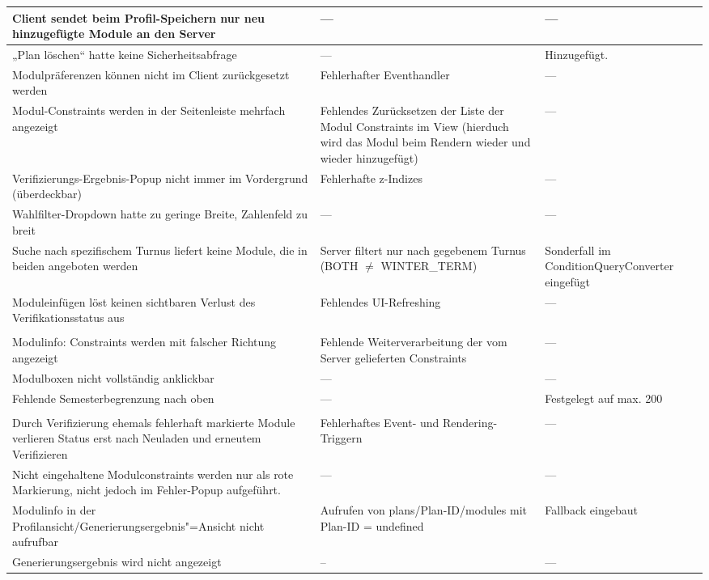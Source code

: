\begin{longtable}{| >{\hspace{0pt}} p{} | >{\hspace{0pt}} p{} | >{\hspace{0pt}} p{} | }
	\hline
	Client sendet beim Profil-Speichern nur neu hinzugefügte Module an den Server & --- & --- \\
	\hline
	„Plan löschen“ hatte keine Sicherheitsabfrage & --- & Hinzugefügt. \\
	\hline
	Modulpräferenzen können nicht im Client zurückgesetzt werden & Fehlerhafter Eventhandler & --- \\
	\hline
	Modul-Constraints werden in der Seitenleiste mehrfach angezeigt & Fehlendes Zurücksetzen der Liste der Modul Constraints im View (hierduch wird das Modul beim Rendern wieder und wieder hinzugefügt) & --- \\
	\hline
	Verifizierungs-Ergebnis-Popup nicht immer im Vordergrund (überdeckbar) & Fehlerhafte z-Indizes & --- \\
	\hline
	Wahlfilter-Dropdown hatte zu geringe Breite, Zahlenfeld zu breit & --- & --- \\
	\hline
	Suche nach spezifischem Turnus liefert keine Module, die in beiden angeboten werden & Server filtert nur nach gegebenem Turnus (BOTH $\neq$ WINTER\_TERM) & Sonderfall im ConditionQueryConverter eingefügt \\
	\hline
	Moduleinfügen löst keinen sichtbaren Verlust des Verifikationsstatus aus & Fehlendes UI-Refreshing & --- \\
	\hline
	& & \\
	\hline
	Modulinfo: Constraints werden mit falscher Richtung angezeigt & Fehlende Weiterverarbeitung der vom Server gelieferten Constraints & --- \\
	\hline
	Modulboxen nicht vollständig anklickbar & ---  & --- \\
	\hline
	Fehlende Semesterbegrenzung nach oben & --- & Festgelegt auf max. 200 \\
	\hline
	& & \\
	\hline
	Durch Verifizierung ehemals fehlerhaft markierte Module verlieren Status erst nach Neuladen und erneutem Verifizieren & Fehlerhaftes Event- und Rendering-Triggern & --- \\
	\hline
	Nicht eingehaltene Modulconstraints werden nur als rote Markierung, nicht jedoch im Fehler-Popup aufgeführt. & --- & --- \\
	\hline
	Modulinfo in der Profilansicht/Generierungsergebnis"=Ansicht nicht aufrufbar & Aufrufen von plans/Plan-ID/modules mit Plan-ID = undefined & Fallback eingebaut \\
	\hline
	Generierungsergebnis wird nicht angezeigt & --  & --- \\
	\hline

\end{longtable}
